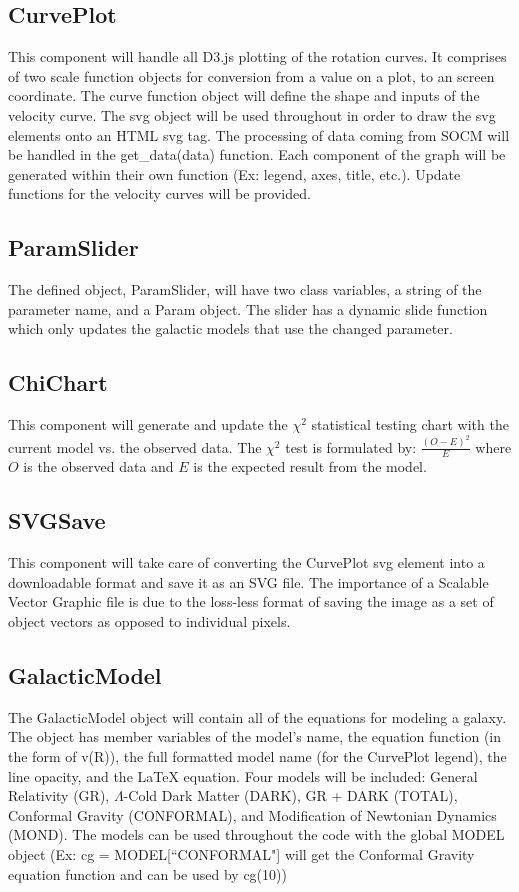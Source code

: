 \documentclass[titlepage]{article}
\begin{document}
\subsection{CurvePlot}
This component will handle all D3.js plotting of the rotation curves. It comprises of two scale function objects for conversion from a value on a plot, to an screen coordinate. The curve function object will define the shape and inputs of the velocity curve. The svg object will be used throughout in order to draw the svg elements onto an HTML svg tag. The processing of data coming from SOCM will be handled in the get\_data(data) function. Each component of the graph will be generated within their own function (Ex: legend, axes, title, etc.). Update functions for the velocity curves will be provided.

\subsection{ParamSlider}
The defined object, ParamSlider, will have two class variables, a string of the parameter name, and a Param object. The slider has a dynamic slide function which only updates the galactic models that use the changed parameter. 

\subsection{ChiChart}
This component will generate and update the $\chi^2$ statistical testing chart with the current model vs. the observed data. The $\chi^2$ test is formulated by: $\frac{(O - E)^2}{E}$ where $O$ is the observed data and $E$ is the expected result from the model.


\subsection{SVGSave}
This component will take care of converting the CurvePlot svg element into a downloadable format and save it as an SVG file. The importance of a Scalable Vector Graphic file is due to the loss-less format of saving the image as a set of object vectors as opposed to individual pixels.

\subsection{GalacticModel}
The GalacticModel object will contain all of the equations for modeling a galaxy. The object has member variables of the model's name, the equation function (in the form of v(R)), the full formatted model name (for the CurvePlot legend), the line opacity, and the \LaTeX \- equation. Four models will be included: General Relativity (GR), $\Lambda$-Cold Dark Matter (DARK), GR + DARK (TOTAL), Conformal Gravity (CONFORMAL), and Modification of Newtonian Dynamics (MOND). The models can be used throughout the code with the global MODEL object (Ex: cg = MODEL[``CONFORMAL"] will get the Conformal Gravity equation function and can be used by cg(10))
\end{document}
